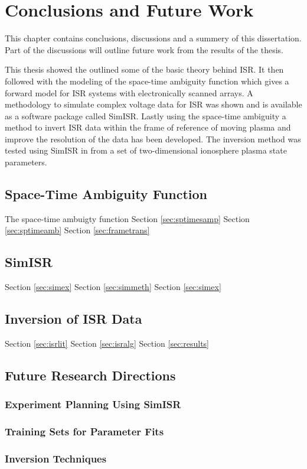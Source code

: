 \chapter{Conclusions and Future Work}
\label{chapter:Conclusions}
\thispagestyle{myheadings}

\graphicspath{{6_Conclusion/Figures/}}
This chapter contains conclusions, discussions and a summery of this dissertation. Part of the discussions will outline future work from the results of the thesis.

This thesis showed the outlined some of the basic theory behind ISR. It then followed with the modeling of the space-time ambiguity function which gives a forward model for ISR systems with electronically scanned arrays. A methodology to simulate complex voltage data for ISR was shown and is available as a software package called SimISR. Lastly using the space-time ambiguity a method to invert ISR data within the frame of reference of moving plasma and improve the resolution of the data has been developed. The inversion method was tested using SimISR in from a set of two-dimensional ionosphere plasma state parameters.

\section{Space-Time Ambiguity Function}
The space-time ambuigty function 
Section \ref{sec:sptimesamp} Section \ref{sec:sptimeamb} Section \ref{sec:frametrans} 
\section{SimISR}
Section \ref{sec:simex} Section \ref{sec:simmeth} Section \ref{sec:simex}
\section{Inversion of ISR Data}
Section \ref{sec:isrlit} Section \ref{sec:isralg} Section \ref{sec:results}
\section{Future Research Directions}

\subsection{Experiment Planning Using SimISR}

\subsection{Training Sets for Parameter Fits}

\subsection{Inversion Techniques}
